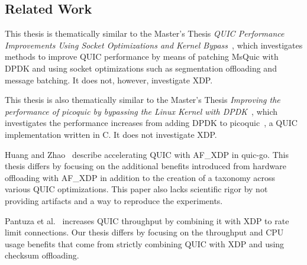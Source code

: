 \documentclass[NET,a4paper,12pt,english]{netforms}
\begin{document}


\subsection*{Related Work}


This thesis is thematically similar to the Master's Thesis \emph{QUIC Performance Improvements Using Socket Optimizations and Kernel Bypass}~\cite{spaeth2023}, which investigates methods to improve QUIC performance by means of patching MsQuic with DPDK and using socket optimizations such as segmentation offloading and message batching. It does not, however, investigate XDP.

This thesis is also thematically similar to the Master's Thesis \emph{Improving the performance of picoquic by bypassing the Linux
Kernel with DPDK}~\cite{nikita2021}, which investigates the performance increases from adding DPDK to picoquic~\cite{picoquic}, a QUIC implementation written in C. It does not investigate XDP.

Huang and Zhao~\cite{10.1007/978-981-97-0798-0_6} describe accelerating QUIC with AF\_XDP in quic-go. This thesis differs by focusing on the additional benefits introduced from hardware offloading with AF\_XDP in addition to the creation of a taxonomy across various QUIC optimizations. This paper also lacks scientific rigor by not providing artifacts and a way to reproduce the experiments.

Pantuza et al.~\cite{eQUIC_Gateway} increases QUIC throughput by combining it with XDP to rate limit connections. Our thesis differs by focusing on the throughput and CPU usage benefits that come from strictly combining QUIC with XDP and using checksum offloading.
\end{document}
